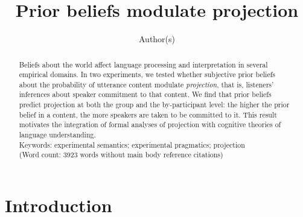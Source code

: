 \documentclass[11pt,fleqn]{article}
\title{Prior beliefs modulate projection}
\author{Author(s)}
\newcommand{\6}{\mbox{$[\hspace*{-.6mm}[$}}
\newcommand{\9}{\mbox{$]\hspace*{-.6mm}]$}}
\begin{document}

\maketitle

\begin{abstract}

Beliefs about the world affect language processing and interpretation in several empirical domains. In two experiments, we tested whether subjective prior beliefs about the probability of utterance content modulate \emph{projection}, that is, listeners' inferences about speaker commitment to that content. We find that prior beliefs predict projection at both the group and the by-participant level: the higher the prior belief in a content, the more speakers are taken to be committed to it. This result motivates the integration of formal analyses of projection with cognitive theories of language understanding.  \\ 
Keywords: experimental semantics; experimental pragmatics; projection \\
(Word count: 3923 words without main body reference citations)

\end{abstract}


\section{Introduction}
\end{document}
